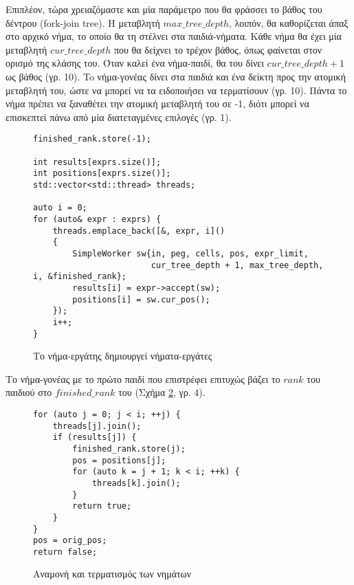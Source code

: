 Επιπλέον, τώρα χρειαζόμαστε και μία παράμετρο που θα φράσσει το βάθος του δέντρου (fork-join tree).
Η μεταβλητή $max\_tree\_depth$, λοιπόν, θα καθορίζεται άπαξ στο αρχικό νήμα, το οποίο θα τη στέλνει στα παιδιά-νήματα.
Κάθε νήμα θα έχει μία μεταβλητή $cur\_tree\_depth$ που θα δείχνει το τρέχον βάθος, όπως φαίνεται στον ορισμό της κλάσης του.
Όταν καλεί ένα νήμα-παιδί, θα του δίνει $cur\_tree\_depth + 1$ ως βάθος (γρ. 10).
To νήμα-γονέας δίνει στα παιδιά και ένα δείκτη προς την ατομική μεταβλητή του, ώστε να μπορεί να τα ειδοποιήσει να τερματίσουν (γρ. 10).
Πάντα το νήμα πρέπει να ξαναθέτει την ατομική μεταβλητή του σε -1, διότι μπορεί να επισκεπτεί πάνω από μία διατεταγμένες επιλογές (γρ. 1).
\begin{figure}[h]
\setlength\partopsep{-\topsep}%
\begin{verbatim}
finished_rank.store(-1);

int results[exprs.size()];
int positions[exprs.size()];
std::vector<std::thread> threads;

auto i = 0;
for (auto& expr : exprs) {
    threads.emplace_back([&, expr, i]()
    {
        SimpleWorker sw{in, peg, cells, pos, expr_limit, 
                        cur_tree_depth + 1, max_tree_depth, i, &finished_rank};
        results[i] = expr->accept(sw);
        positions[i] = sw.cur_pos();
    });
    i++;
}
\end{verbatim}
  \caption{Tο νήμα-εργάτης δημιουργεί νήματα-εργάτες}
\label{fig:rec_top_down_spawn}
\end{figure}

Το νήμα-γονέας με το πρώτο παιδί που επιστρέφει επιτυχώς βάζει το $rank$ του παιδιού στο $finished\_rank$ του (Σχήμα \ref{fig:rec_top_down_join}, γρ. 4). 

\begin{figure}[h]
\setlength\partopsep{-\topsep}%
\begin{verbatim}
for (auto j = 0; j < i; ++j) {
    threads[j].join();
    if (results[j]) {
        finished_rank.store(j);
        pos = positions[j];
        for (auto k = j + 1; k < i; ++k) {
            threads[k].join();
        }
        return true;
    }
}
pos = orig_pos;
return false;
\end{verbatim}
  \caption{Αναμονή και τερματισμός των νημάτων}
\label{fig:rec_top_down_join}
\end{figure}

